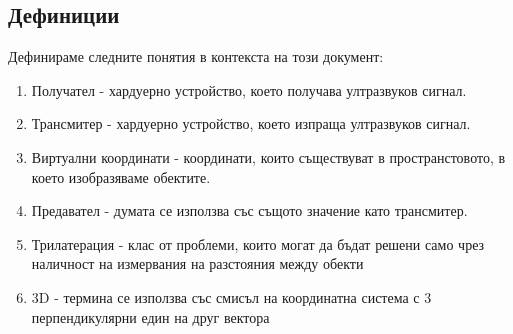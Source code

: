 \subsection{Дефиниции}
Дефинираме следните понятия в контекста на този документ:
\begin{enumerate}
    \item Получател - хардуерно устройство, което получава ултразвуков сигнал.
    \item Трансмитер - хардуерно устройство, което изпраща ултразвуков сигнал.
    \item Виртуални координати - координати, които съществуват в пространстовото, в което изобразяваме обектите.
    \item Предавател - думата се използва със същото значение като трансмитер.
    \item Трилатерация - клас от проблеми, които могат да бъдат решени само чрез наличност на измервания на разстояния между обекти \cite{murphy}
    \item 3D - термина се използва със смисъл на координатна система с 3 перпендикулярни един на друг вектора \cite{3d}
\end{enumerate}

